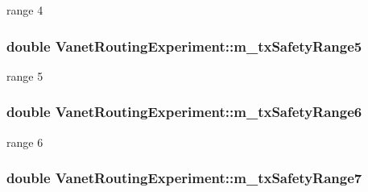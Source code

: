 range 4 

\subsubsection[{\texorpdfstring{m\+\_\+tx\+Safety\+Range5}{m_txSafetyRange5}}]{\setlength{\rightskip}{0pt plus 5cm}double Vanet\+Routing\+Experiment\+::m\+\_\+tx\+Safety\+Range5\hspace{0.3cm}{\ttfamily [private]}}\hypertarget{classVanetRoutingExperiment_a2b3e42d76f8d74100087b633e4b9295f}{}\label{classVanetRoutingExperiment_a2b3e42d76f8d74100087b633e4b9295f}


range 5 

\subsubsection[{\texorpdfstring{m\+\_\+tx\+Safety\+Range6}{m_txSafetyRange6}}]{\setlength{\rightskip}{0pt plus 5cm}double Vanet\+Routing\+Experiment\+::m\+\_\+tx\+Safety\+Range6\hspace{0.3cm}{\ttfamily [private]}}\hypertarget{classVanetRoutingExperiment_a19582595367bfd9fde2febb9108b6fea}{}\label{classVanetRoutingExperiment_a19582595367bfd9fde2febb9108b6fea}


range 6 

\subsubsection[{\texorpdfstring{m\+\_\+tx\+Safety\+Range7}{m_txSafetyRange7}}]{\setlength{\rightskip}{0pt plus 5cm}double Vanet\+Routing\+Experiment\+::m\+\_\+tx\+Safety\+Range7\hspace{0.3cm}{\ttfamily [private]}}\hypertarget{classVanetRoutingExperiment_a5d3143091b54bcabaf43bea41d464bdb}{}\label{classVanetRoutingExperiment_a5d3143091b54bcabaf43bea41d464bdb}


